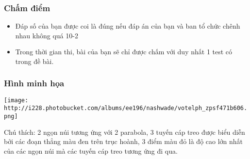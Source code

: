 \subsubsection{   Chấm điểm  }
\begin{itemize}
	\item     Đáp số của bạn được coi là đúng nếu đáp án của bạn và ban tổ chức chênh nhau không quá 10-2   
	\item     Trong thời gian thi, bài của bạn sẽ chỉ được chấm với duy nhất 1 test có trong đề bài.   
\end{itemize}

\subsubsection{   Hình minh họa  }




\texttt{[image: http://i228.photobucket.com/albums/ee196/nashwade/votelph\_zpsf471b606.png]}

Chú thích: 2 ngọn núi tương ứng với 2 parabola, 3 tuyến cáp treo được biểu diễn bởi các đoạn thẳng màu đen trên trục hoành, 3 điểm màu đỏ là độ cao lớn nhất của các ngọn núi mà các tuyến cáp treo tương ứng đi qua.
